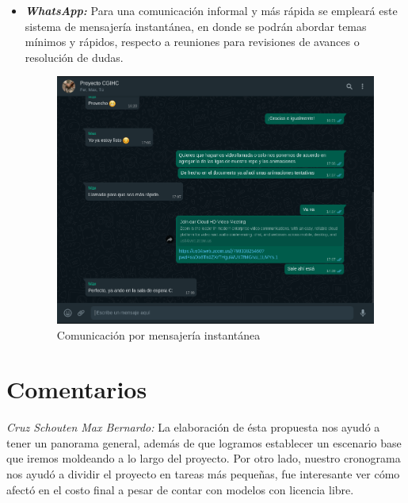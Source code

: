 \documentclass[12pt]{article} %
\begin{document}
\begin{itemize}
		\item[\textbullet] \emph{\textbf{WhatsApp:}} Para una comunicación informal y más rápida se empleará este sistema de mensajería instantánea, en donde se podrán abordar temas mínimos y rápidos, respecto a reuniones para revisiones de avances o resolución de dudas. 
		\begin{figure}[h]
			\begin{center}
				\includegraphics[scale=0.99]{images/grupo.png}
				\caption{Comunicación por mensajería instantánea}
			\end{center}  		
		\end{figure}
\end{itemize}

    \newpage
	\section{Comentarios}
 	
	\emph{Cruz Schouten Max Bernardo:}
	La elaboración de ésta propuesta nos ayudó a tener un panorama general, además de que logramos establecer un escenario 
	base que iremos moldeando a lo largo del proyecto. Por otro lado, nuestro cronograma nos ayudó a dividir el proyecto en 
	tareas más pequeñas, fue interesante ver cómo afectó en el costo final a pesar de contar con modelos con licencia libre.
	\\
	
\end{document}
